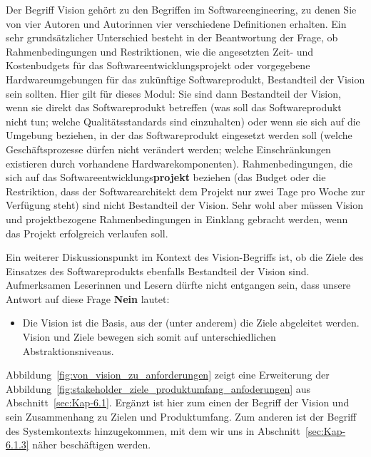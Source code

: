 Der  Begriff Vision gehört zu den Begriffen im Softwareengineering, zu denen Sie von vier Autoren und Autorinnen vier verschiedene Definitionen erhalten. Ein sehr grundsätzlicher Unterschied besteht in der Beantwortung der Frage, ob Rahmenbedingungen und Restriktionen, wie die angesetzten Zeit- und Kostenbudgets für das Softwareentwicklungsprojekt oder vorgegebene Hardwareumgebungen für das zukünftige Softwareprodukt, Bestandteil der Vision sein sollten. Hier gilt für dieses Modul: Sie sind dann Bestandteil der Vision, wenn sie direkt das Softwareprodukt betreffen (\zb was soll das Softwareprodukt nicht tun; welche Qualitätsstandards sind einzuhalten) oder wenn sie sich auf die Umgebung beziehen, in der das Softwareprodukt eingesetzt werden soll (\zb welche Geschäftsprozesse dürfen nicht verändert werden; welche Einschränkungen existieren durch vorhandene Hardwarekomponenten). Rahmenbedingungen, die sich auf das Softwareentwicklungs\textbf{projekt} beziehen (\zb das Budget oder die Restriktion, dass der Softwarearchitekt dem Projekt nur zwei Tage pro Woche zur Verfügung steht) sind nicht Bestandteil der Vision. Sehr wohl aber müssen Vision und projektbezogene Rahmenbedingungen in Einklang gebracht werden, wenn das Projekt erfolgreich verlaufen soll. 

Ein weiterer Diskussionspunkt im Kontext des Vision-Begriffs ist, ob die Ziele des Einsatzes des Softwareprodukts ebenfalls Bestandteil der Vision sind. Aufmerksamen Leserinnen und Lesern dürfte nicht entgangen sein, dass unsere Antwort auf diese Frage \textbf{Nein} lautet: 

\begin{itemize}[
	label={\sttpHervorhebung{$\Rightarrow$}},
	]
	\item Die Vision ist die Basis, aus der (unter anderem) die Ziele abgeleitet werden. Vision und Ziele bewegen sich somit auf unterschiedlichen Abstraktions\-niveaus.
\end{itemize}

Abbildung~\ref{fig:von_vision_zu_anforderungen} zeigt eine Erweiterung der Abbildung~\ref{fig:stakeholder_ziele_produktumfang_anfoderungen} aus Abschnitt~\ref{sec:Kap-6.1}. Ergänzt ist hier zum einen der Begriff der Vision und sein Zusammenhang zu Zielen und Produktumfang. Zum anderen ist der Begriff des Systemkontexts hinzugekommen, mit dem wir uns in Abschnitt~\ref{sec:Kap-6.1.3} näher beschäftigen werden. 

\vspace{\baselineskip} %
\vspace{\baselineskip} %

